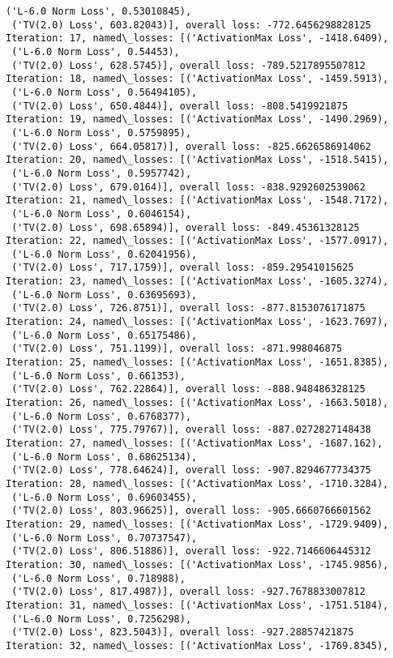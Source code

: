 \documentclass[10pt]{article}
\begin{document}
\begin{Verbatim}[commandchars=\\\{\}]
 ('L-6.0 Norm Loss', 0.53010845),
 ('TV(2.0) Loss', 603.82043)], overall loss: -772.6456298828125
Iteration: 17, named\_losses: [('ActivationMax Loss', -1418.6409),
 ('L-6.0 Norm Loss', 0.54453),
 ('TV(2.0) Loss', 628.5745)], overall loss: -789.5217895507812
Iteration: 18, named\_losses: [('ActivationMax Loss', -1459.5913),
 ('L-6.0 Norm Loss', 0.56494105),
 ('TV(2.0) Loss', 650.4844)], overall loss: -808.5419921875
Iteration: 19, named\_losses: [('ActivationMax Loss', -1490.2969),
 ('L-6.0 Norm Loss', 0.5759895),
 ('TV(2.0) Loss', 664.05817)], overall loss: -825.6626586914062
Iteration: 20, named\_losses: [('ActivationMax Loss', -1518.5415),
 ('L-6.0 Norm Loss', 0.5957742),
 ('TV(2.0) Loss', 679.0164)], overall loss: -838.9292602539062
Iteration: 21, named\_losses: [('ActivationMax Loss', -1548.7172),
 ('L-6.0 Norm Loss', 0.6046154),
 ('TV(2.0) Loss', 698.65894)], overall loss: -849.45361328125
Iteration: 22, named\_losses: [('ActivationMax Loss', -1577.0917),
 ('L-6.0 Norm Loss', 0.62041956),
 ('TV(2.0) Loss', 717.1759)], overall loss: -859.29541015625
Iteration: 23, named\_losses: [('ActivationMax Loss', -1605.3274),
 ('L-6.0 Norm Loss', 0.63695693),
 ('TV(2.0) Loss', 726.8751)], overall loss: -877.8153076171875
Iteration: 24, named\_losses: [('ActivationMax Loss', -1623.7697),
 ('L-6.0 Norm Loss', 0.65175486),
 ('TV(2.0) Loss', 751.1199)], overall loss: -871.998046875
Iteration: 25, named\_losses: [('ActivationMax Loss', -1651.8385),
 ('L-6.0 Norm Loss', 0.661353),
 ('TV(2.0) Loss', 762.22864)], overall loss: -888.948486328125
Iteration: 26, named\_losses: [('ActivationMax Loss', -1663.5018),
 ('L-6.0 Norm Loss', 0.6768377),
 ('TV(2.0) Loss', 775.79767)], overall loss: -887.0272827148438
Iteration: 27, named\_losses: [('ActivationMax Loss', -1687.162),
 ('L-6.0 Norm Loss', 0.68625134),
 ('TV(2.0) Loss', 778.64624)], overall loss: -907.8294677734375
Iteration: 28, named\_losses: [('ActivationMax Loss', -1710.3284),
 ('L-6.0 Norm Loss', 0.69603455),
 ('TV(2.0) Loss', 803.96625)], overall loss: -905.6660766601562
Iteration: 29, named\_losses: [('ActivationMax Loss', -1729.9409),
 ('L-6.0 Norm Loss', 0.70737547),
 ('TV(2.0) Loss', 806.51886)], overall loss: -922.7146606445312
Iteration: 30, named\_losses: [('ActivationMax Loss', -1745.9856),
 ('L-6.0 Norm Loss', 0.718988),
 ('TV(2.0) Loss', 817.4987)], overall loss: -927.7678833007812
Iteration: 31, named\_losses: [('ActivationMax Loss', -1751.5184),
 ('L-6.0 Norm Loss', 0.7256298),
 ('TV(2.0) Loss', 823.5043)], overall loss: -927.28857421875
Iteration: 32, named\_losses: [('ActivationMax Loss', -1769.8345),

\end{Verbatim}
\end{document}
